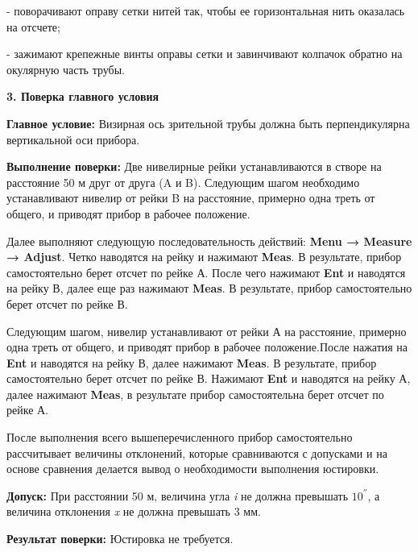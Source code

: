 \documentclass[a4paper]{article}
\begin{document}
{\par - поворачивают оправу сетки нитей так, чтобы ее горизонтальная нить оказалась на отсчете;
\par - зажимают крепежные винты оправы сетки и завинчивают колпачок обратно на окулярную часть трубы.
\par\textbf{3. Поверка главного условия}
\par \textbf{Главное условие:} Визирная ось зрительной трубы должна быть перпендикулярна вертикальной оси прибора.
\par \textbf{Выполнение поверки:} Две нивелирные рейки устанавливаются в створе на расстояние 50 м друг от друга (A и B). Следующим шагом необходимо устанавливают нивелир от рейки B на расстояние, примерно одна треть от общего, и приводят прибор в рабочее положение. 
\par Далее выполняют следующую последовательность действий: \textbf{Menu → Measure → Adjust}. Четко наводятся на рейку и нажимают \textbf{Meas}. В результате, прибор самостоятельно берет отсчет по рейке А. После чего нажимают \textbf{Ent} и наводятся на рейку В, далее еще раз нажимают \textbf{Meas}. В результате, прибор самостоятельно берет отсчет по рейке В.
\par Следующим шагом, нивелир устанавливают от рейки А на расстояние, примерно одна треть от общего, и приводят прибор в рабочее положение.После нажатия на \textbf{Ent} и наводятся на рейку В, далее нажимают \textbf{Meas}. В результате, прибор самостоятельно берет отсчет по рейке В. Нажимают \textbf{Ent} и наводятся на рейку А, далее нажимают \textbf{Meas}, в результате прибор самостоятельна берет отсчет по рейке А.
\par После выполнения всего вышеперечисленного прибор самостоятельно рассчитывает величины отклонений, которые сравниваются с допусками и на основе сравнения делается вывод о необходимости выполнения юстировки.
\par \textbf{Допуск:} При расстоянии 50 м, величина угла \textit{i} не должна превышать $10^{''}$, а величина отклонения \textit{x} не должна превышать 3 мм. 
\par \textbf{Результат поверки:} Юстировка не требуется.
}
\end{document}
